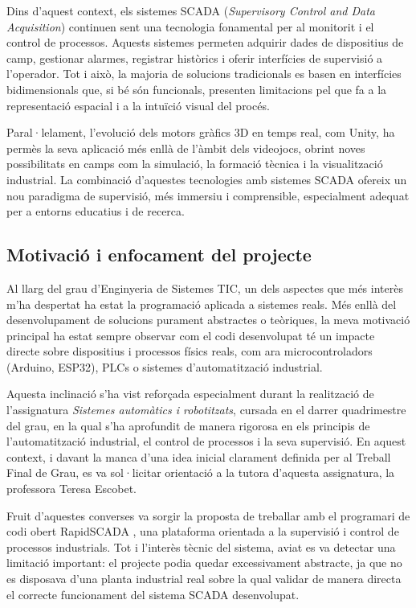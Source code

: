 \documentclass[a4paper,11pt,DIV=13,headings=normal,abstract=true,twoside=semi]{article}
\begin{document}
Dins d'aquest context, els sistemes SCADA (\textit{Supervisory Control and Data Acquisition}) continuen sent una tecnologia fonamental per al monitorit i el control de processos. Aquests sistemes permeten adquirir dades de dispositius de camp, gestionar alarmes, registrar històrics i oferir interfícies de supervisió a l'operador. Tot i això, la majoria de solucions tradicionals es basen en interfícies bidimensionals que, si bé són funcionals, presenten limitacions pel que fa a la representació espacial i a la intuïció visual del procés.

Paral·lelament, l'evolució dels motors gràfics 3D en temps real, com Unity, ha permès la seva aplicació més enllà de l'àmbit dels videojocs, obrint noves possibilitats en camps com la simulació, la formació tècnica i la visualització industrial. La combinació d'aquestes tecnologies amb sistemes SCADA ofereix un nou paradigma de supervisió, més immersiu i comprensible, especialment adequat per a entorns educatius i de recerca.

\subsection{Motivació i enfocament del projecte}

Al llarg del grau d'Enginyeria de Sistemes TIC, un dels aspectes que més interès m'ha despertat ha estat la programació aplicada a sistemes reals. Més enllà del desenvolupament de solucions purament abstractes o teòriques, la meva motivació principal ha estat sempre observar com el codi desenvolupat té un impacte directe sobre dispositius i processos físics reals, com ara microcontroladors (Arduino, ESP32), PLCs o sistemes d'automatització industrial.


Aquesta inclinació s'ha vist reforçada especialment durant la realització de l'assignatura \textit{Sistemes automàtics i robotitzats}, cursada en el darrer quadrimestre del grau, en la qual s'ha aprofundit de manera rigorosa en els principis de l'automatització industrial, el control de processos i la seva supervisió. En aquest context, i davant la manca d'una idea inicial clarament definida per al Treball Final de Grau, es va sol·licitar orientació a la tutora d'aquesta assignatura, la professora Teresa Escobet.


Fruit d'aquestes converses va sorgir la proposta de treballar amb el programari de codi obert RapidSCADA \cite{RapidScada}, una plataforma orientada a la supervisió i control de processos industrials. Tot i l'interès tècnic del sistema, aviat es va detectar una limitació important: el projecte podia quedar excessivament abstracte, ja que no es disposava d'una planta industrial real sobre la qual validar de manera directa el correcte funcionament del sistema SCADA desenvolupat.
\end{document}
